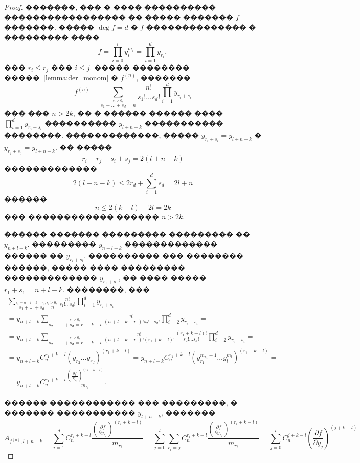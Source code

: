 \documentclass[16pt]{article}
\theoremstyle{plain}
\theoremstyle{definition}
\theoremstyle{remark}
\begin{document}
\begin{proof}
�������, ��� � ���� ���������� ����������������� �� ����� �������
$f$ �������. ����� $\deg f = d$ � $f$ �������������� �
��������� ����
$$
f=\prod\limits_{i=0}^ly_i^{m_i}=\prod\limits_{i=1}^{d}y_{r_i},
$$
��� $r_i\leqslant r_j$ ��� $i \leqslant j$. ����� �������� �����~\ref{lemma:der_monom} � $f^{(n)}$,
�������
$$
f^{(n)}=\sum\limits_{\stackrel{s_i\geqslant0,}{
s_1+\ldots+s_d=n}}\frac{n!}{s_1!\ldots s_d!}
\prod\limits_{i=1}^dy_{r_i+s_i}
$$
��� ��� $n>2k$, �� � ������ ������ ���� $\prod_{i=1}^d y_{r_i+s_i}$
���������� $y_{l+n-k}$ ����������� ��������. �������������, �����
$y_{r_i+s_i}=y_{l+n-k}$ � $y_{r_j+s_j}=y_{l+n-k}$. �� �����
$$
r_i+r_j +s_i+s_j = 2(l+n-k)
$$
�������������
$$
2(l+n-k)\leqslant 2r_d + \sum_{i=1}^d s_d = 2l +n
$$
������
$$
n \leqslant 2(k-l) + 2l =2k
$$
��� ������������ ������ $n>2k$.


������ ������� ��������� ��������� �� $y_{n+l-k}$. ���������
$y_{n+l-k}$ ������������� ������ �� $y_{r_i+s_i}$. ���������� ���
�������� ������, ����� ���� ��������� ������������� $y_{r_1+s_1}$,
�� ���� ����� $r_1+s_1 = n+l-k$.  ��������, ���
\begin{gather*}
\sum\limits_{\stackrel{s_1 =n+l-k-r_1,
s_i\geqslant0,}{s_1+\ldots+s_d=n}}\frac{n!}{s_1!\ldots s_d!}\prod\limits_{i=1}^dy_{r_i+s_i}=\\
=y_{n+l-k}\sum\limits_{\stackrel{
s_i\geqslant0,}{s_2+\ldots+s_d=r_1+k-l}}\frac{n!}{(n+l-k-r_1)!s_2!\ldots s_d!}\prod\limits_{i=2}^dy_{r_i+s_i}=\\
=y_{n+l-k}\sum\limits_{\stackrel{
s_i\geqslant0,}{s_2+\ldots+s_d=r_1+k-l}}\frac{n!}{(n+l-k-r_1)!(r_1+k-l)!}\frac{(r_1+k-l)!}{s_2!\ldots s_d!}\prod\limits_{i=2}^dy_{r_i+s_i}=\\
=y_{n+l-k}C_n^{r_1+k-l} (y_{r_2}\ldots y_{r_d})^{(r_1+k-l)} =
y_{n+l-k}C_n^{r_1+k-l}(y_{r_1}^{m_{r_1}-1}\ldots
y_{l}^{m_l})^{(r_1+k-l)}=\\
=y_{n+l-k}C_n^{r_1+k-l}\frac{\left(\frac{\partial f}{\partial
y_{r_1}}\right)^{(r_1+k -l)}}{m_{r_1}}.
\end{gather*}

������ ������������ ��� ���������, � ������� �����������
$y_{l+n-k}$, �������
$$
A_{f^{(n)},l+n-k} = \sum_{i=1}^{d}
C_n^{r_i+k-l}\frac{\left(\frac{\partial f}{\partial
y_{r_i}}\right)^{(r_i+k -l)}}{m_{r_i}}= \sum_{j=0}^l \sum_{r_i = j}
C_n^{r_i+k-l}\frac{\left(\frac{\partial f}{\partial
y_{r_i}}\right)^{(r_i+k -l)}}{m_{r_i}} = \sum_{j=0}^l C_n^{j+k-l}
\left(\frac{\partial f}{\partial y_{j}}\right)^{(j+k-l)}
$$

\end{proof}
\end{document}

